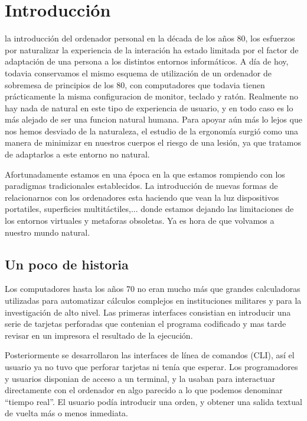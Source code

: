 \chapter{Introducción}

 la introducción del ordenador personal en la década de los años 80, los esfuerzos por naturalizar la experiencia de la interación ha estado limitada por el factor de adaptación de una persona a los distintos entornos informáticos. A día de hoy, todavia conservamos el mismo esquema de utilización de un ordenador de sobremesa de principios de los 80, con computadores que todavia tienen prácticamente la misma configuracion de monitor, teclado y ratón. Realmente no hay nada de natural en este tipo de experiencia de usuario, y en todo caso es lo más alejado de ser una funcion natural humana. Para apoyar aún más lo lejos que nos hemos desviado de la naturaleza, el estudio de la ergonomía surgió como una manera de minimizar en nuestros cuerpos el riesgo de una lesión, ya que tratamos de adaptarlos a este entorno no natural.

Afortunadamente estamos en una época en la que estamos rompiendo con los paradigmas tradicionales establecidos. La introducción de nuevas formas de relacionarnos con los ordenadores esta haciendo que vean la luz dispositivos portatiles, superficies multitáctiles,... donde estamos dejando las limitaciones de los entornos virtuales y metaforas obsoletas. Ya es hora de que volvamos a nuestro mundo natural.

\section{Un poco de historia}
Los computadores hasta los años 70 no eran mucho más que grandes calculadoras utilizadas para automatizar cálculos complejos en instituciones militares y para la investigación de alto nivel. Las primeras interfaces consistian en introducir una serie de tarjetas perforadas que contenian el programa codificado y mas tarde revisar en un impresora el resultado de la ejecución.

Posteriormente se desarrollaron las interfaces de línea de comandos (CLI), así el usuario ya no tuvo que perforar tarjetas ni tenía que esperar. Los programadores y usuarios disponian de acceso a un terminal, y la usaban para interactuar directamente con el ordenador en algo parecido a lo que podemos denominar ``tiempo real''. El usuario podía introducir una orden, y obtener una salida textual de vuelta más o menos inmediata.

